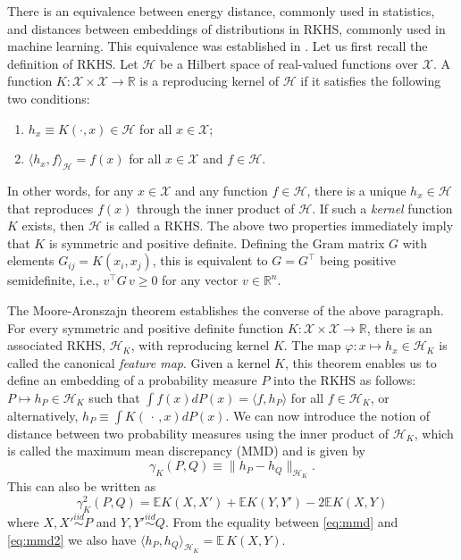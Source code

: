 \documentclass[10pt,journal,compsoc]{IEEEtran}
\newcommand\E{\mathbb{E}}
\newcommand\kk{K}
\newcommand\kkk{h}
\newcommand\Hk{{\mathcal{H}}_{\kk}}
\newcommand\HH{\mathcal{H}}
\begin{document}
There is an equivalence between energy distance, 
commonly used in statistics,
and distances between embeddings of distributions in 
RKHS, commonly used in machine learning. 
This equivalence was established
in \cite{Sejdinovic2013}. Let us first recall the definition of
RKHS. Let $\HH$ be a Hilbert space of real-valued functions
over $\mathcal{X}$. A function 
$\kk : \mathcal{X} \times \mathcal{X} \to 
\mathbb{R}$ is a reproducing kernel of $\HH$ if it satisfies
the following two conditions:
\begin{enumerate}
\item $\kkk_x \equiv \kk(\cdot, x) \in \HH$ 
for all $x \in \mathcal{X}$;
\item $\langle \kkk_x, f \rangle_{\HH} = f(x)$ for
all $x\in\mathcal{X}$ and $f\in \HH$.
\end{enumerate}
In other words, for any $x \in \mathcal{X}$ and any function $f \in \HH$,
there is a unique 
$\kkk_x \in \HH$ that reproduces $f(x)$ through the inner product
of $\HH$.
If such a \emph{kernel} 
function $\kk$ exists, then $\HH$ is called a RKHS. The above two 
properties immediately imply that $\kk$ is symmetric and positive
definite. 
Defining the Gram matrix $G$ with
elements $G_{ij} = \kk(x_i,x_j)$, this is equivalent to $G=G^\top$ being
positive semidefinite, i.e., $v^\top G \, v \ge 0$ for any vector
$v \in \mathbb{R}^n$.

The Moore-Aronszajn theorem 
\cite{Aronszajn}
establishes the converse of the above paragraph.
For every symmetric
and positive definite function $\kk: \mathcal{X}\times \mathcal{X} \to
\mathbb{R}$, there is an associated RKHS, $\Hk$,
with reproducing
kernel $\kk$. The map $\varphi: x \mapsto \kkk_x \in \Hk$ is called
the canonical \emph{feature map}. Given a kernel $\kk$,
this theorem enables us to define an embedding of a probability measure
$P$ into the RKHS as follows: $P \mapsto \kkk_P \in
\Hk$ such that 
$\int f(x) d P(x) = \langle f, \kkk_P \rangle$ for all $f \in \Hk$,
or alternatively, $\kkk_P \equiv \int \kk( \, \cdot \,, x)  d P(x)$. 
We can now  introduce the 
notion of distance between two probability measures using the inner product
of $\Hk$, which is called the maximum mean discrepancy (MMD) and
is given by
\begin{equation}
\label{eq:mmd}
\gamma_\kk(P,Q) \equiv \| \kkk_P - \kkk_Q \|_{\Hk}.
\end{equation}
This can also be written as \cite{Gretton2012}
\begin{equation}\label{eq:mmd2}
\gamma_\kk^2(P,Q) = \E \kk(X,X') + \E \kk(Y,Y') - 2 \E \kk(X, Y)
\end{equation}
where $X,X' \stackrel{iid}{\sim} P$ and $Y,Y'\stackrel{iid}{\sim} Q$.
From the equality between \eqref{eq:mmd} and \eqref{eq:mmd2} we also
have $\langle \kkk_P, \kkk_Q \rangle_{\Hk} = \E \, \kk(X, Y)$.
\end{document}
